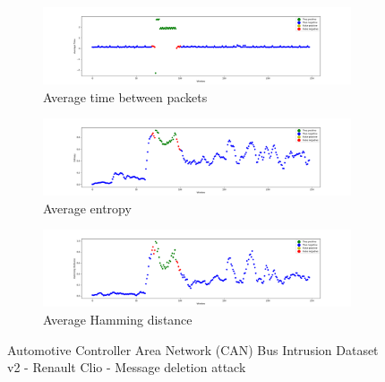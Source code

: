 \begin{figure}
    \centering
    \begin{subfigure}[b]{\linewidth}
        \includegraphics[width = \linewidth]{img/parts/app/tests/tue/RenaultClio/deletion/AvgTime.png}
        \caption{Average time between packets}
        \label{subfig:extract_tue_renaultclio_deletion_avgtime}
    \end{subfigure}
    \begin{subfigure}[b]{\linewidth}
        \includegraphics[width = \linewidth]{img/parts/app/tests/tue/RenaultClio/deletion/Entropy.png}
        \caption{Average entropy}
        \label{subfig:extract_tue_renaultclio_deletion_entropy}
    \end{subfigure}
    \begin{subfigure}[b]{\linewidth}
        \includegraphics[width = \linewidth]{img/parts/app/tests/tue/RenaultClio/deletion/HammingDist.png}
        \caption{Average Hamming distance}
        \label{subfig:extract_tue_renaultclio_deletion_hammingdist}
    \end{subfigure}
    \caption{Automotive Controller Area Network (CAN) Bus Intrusion Dataset v2 - Renault Clio - Message deletion attack}
    \label{fig:extract_tue_renaultclio_deletion}
\end{figure}

